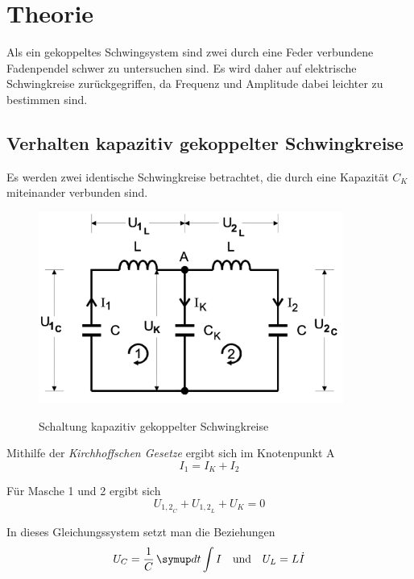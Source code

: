 \section{Theorie}
\label{sec:Theorie}

Als ein gekoppeltes Schwingsystem sind zwei durch eine Feder verbundene Fadenpendel schwer zu untersuchen sind.
Es wird daher auf elektrische Schwingkreise zurückgegriffen, da Frequenz und Amplitude dabei leichter zu bestimmen sind.

\subsection {Verhalten kapazitiv gekoppelter Schwingkreise}

Es werden zwei identische Schwingkreise betrachtet, die durch eine Kapazität $C_{K}$ miteinander verbunden sind.

\begin{figure} 
    \centering
    \includegraphics[width=10cm] {pictures/prinzipschaltbild.png} \cite{v355} 
    \caption{Schaltung kapazitiv gekoppelter Schwingkreise}
    \label{fig:prinzipschaltbild}
\end{figure} 

Mithilfe der \textit{Kirchhoffschen Gesetze} ergibt sich im Knotenpunkt A
\begin{equation}
    I_{1} = I_{K} + I_{2}
\end{equation}

Für Masche 1 und 2 ergibt sich
\begin{equation}
    U_{{1,2}_{C}} + U_{{1,2}_{L}} + U_{K} = 0
\end{equation}

In dieses Gleichungssystem setzt man die Beziehungen
\begin{align} 
    U_{C} &= \frac{1}{C} \dif{t} \int I  & \mbox{\centering und} && U_{L} = L \dot{I} 
\end{align}

